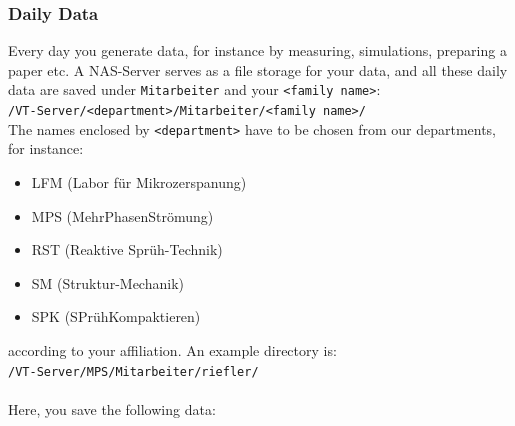 \subsubsection{Daily Data}\label{ssc:daily-data}

Every day you generate data, for instance by measuring, simulations, preparing a
paper etc. A NAS-Server serves as a file storage for your data, and all these
daily data are saved under \texttt{Mitarbeiter} and your
\texttt{<family name>}: \\
\texttt{/VT-Server/<department>/Mitarbeiter/<family name>/} \\
The names enclosed by \texttt{<department>} have to be chosen from our
departments, for instance:
\begin{itemize}
  \item LFM (Labor für Mikrozerspanung)
  \item MPS (MehrPhasenStrömung)
  \item RST (Reaktive Sprüh-Technik)
  \item SM (Struktur-Mechanik)
  \item SPK (SPrühKompaktieren)
\end{itemize}
according to your affiliation. An example directory is: \\
\texttt{/VT-Server/MPS/Mitarbeiter/riefler/} \\
\\
Here, you save the following data:

